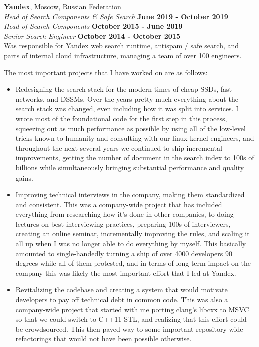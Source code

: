\documentclass[margin,line]{CV}
\begin{document}
\begin{resume}
    \vspace{2mm}
    \textbf{Yandex}, Moscow, Russian Federation\vspace{1mm}\\
    \textsl{Head of Search Components \& Safe Search} \hfill \textbf{June 2019 - October 2019}\vspace{1mm}\\
    \textsl{Head of Search Components} \hfill \textbf{October 2015 - June 2019}\vspace{1mm}\\
    \textsl{Senior Search Engineer} \hfill \textbf{October 2014 - October 2015}\vspace{1mm}\\
    Was responsible for Yandex web search runtime, antispam / safe search, and parts of internal cloud infrastructure, managing a team of over 100 engineers.
    
    \pagebreak

    The most important projects that I have worked on are as follows:
    
    \begin{itemize}
    \item Redesigning the search stack for the modern times of cheap SSDs, fast networks, and DSSMs. Over the years pretty much everything about the search stack was changed, even including how it was split into services. I wrote most of the foundational code for the first step in this process, squeezing out as much performance as possible by using all of the low-level tricks known to humanity and consulting with our linux kernel engineers, and throughout the next several years we continued to ship incremental improvements, getting the number of document in the search index to 100s of billions while simultaneously bringing substantial performance and quality gains.
    \item Improving technical interviews in the company, making them standardized and consistent. This was a company-wide project that has included everything from researching how it's done in other companies, to doing lectures on best interviewing practices, preparing 100s of interviewers, creating an online seminar, incrementally improving the rules, and scaling it all up when I was no longer able to do everything by myself. This basically amounted to single-handedly turning a ship of over 4000 developers 90 degrees while all of them protested, and in terms of long-term impact on the company this was likely the most important effort that I led at Yandex.
    \item Revitalizing the codebase and creating a system that would motivate developers to pay off technical debt in common code. This was also a company-wide project that started with me porting clang's libcxx to MSVC so that we could switch to C++11 STL, and realizing that this effort could be crowdsourced. This then paved way to some important repository-wide refactorings that would not have been possible otherwise.
    \end{itemize}
    \vspace{-4mm}


\end{resume}
\end{document}
